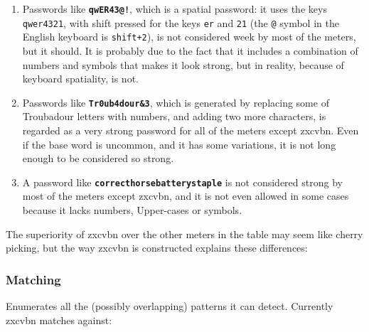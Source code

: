 \begin{enumerate}
\setlength\itemsep{-3pt}

\item Passwords like \texttt{\textbf{qwER43@!}}, which is a spatial password: it uses the keys \texttt{qwer4321}, with shift pressed for the keys \texttt{er} and \texttt{21} (the \texttt{@} symbol in the English keyboard is \texttt{shift+2}), is not considered week by most of the meters, but it should. It is probably due to the fact that it includes a combination of numbers and symbols that makes it look strong, but in reality, because of keyboard spatiality, is not.

\item Passwords like \texttt{\textbf{Tr0ub4dour\&3}}, which is generated by replacing some of Troubadour letters with numbers, and adding two more characters, is regarded as a very strong password for all of the meters except zxcvbn. Even if the base word is uncommon, and it has some variations, it is not long enough to be considered so strong.
\item A password like \texttt{\textbf{correcthorsebatterystaple}} is not considered strong by most of the meters except zxcvbn, and it is not even allowed in some cases because it lacks numbers, Upper-cases or symbols.
\end{enumerate}

The superiority of zxcvbn over the other meters in the table may seem like cherry picking, but the way zxcvbn is constructed explains these differences:

\subsubsection*{Matching}

Enumerates all the (possibly overlapping) patterns it can detect. Currently zxcvbn matches against:

